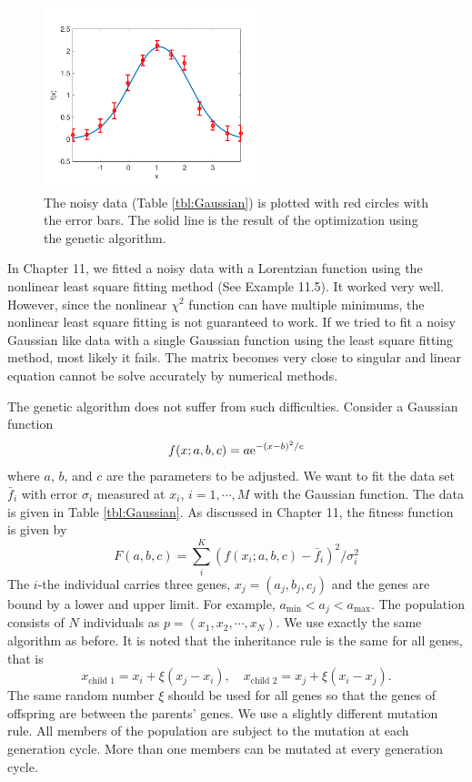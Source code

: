 \begin{figure}
\centering
\includegraphics[width=2.5in]{19.Optimization/ga_gauss.pdf}
\caption{The noisy data (Table \ref{tbl:Gaussian}) is plotted with red circles with the error bars.  The solid line is the result of the optimization using the genetic algorithm.}
\label{fig:ga_gauss}
\end{figure}

In Chapter 11, we fitted a noisy data with a Lorentzian function using the nonlinear least square fitting method (See Example 11.5). It worked very well.  However, since the nonlinear $\chi^2$ function can have multiple minimums, the nonlinear least square fitting is not guaranteed to work.   If we tried to fit a noisy Gaussian like data with a single Gaussian function using the least square fitting method, most likely it fails.  The matrix becomes very close to singular and linear equation cannot be solve accurately by numerical methods.

The genetic algorithm does not suffer from such difficulties.  Consider a Gaussian function 
\begin{equation}
f(x;a,b,c) = a \text{e}^{-(x-b)^2/c}
\end{equation}
where $a$, $b$, and $c$ are the parameters to be adjusted.  We want to fit the data set $\bar{f}_i$ with error $\sigma_i$ measured at $x_i$, $i=1, \cdots, M$ with the Gaussian function. The data is given in Table \ref{tbl:Gaussian}. As discussed in Chapter 11, the fitness function is given by
\begin{equation}
F(a,b,c) = \sum_i^K \left (f(x_i;a,b,c)-\bar{f}_i\right )^2/\sigma_i^2
\end{equation}
The $i$-the individual carries three genes, $x_j=(a_j, b_j, c_j)$ and the genes are bound by a lower and upper limit.  For example, $a_\text{min} < a_j < a_\text{max}$. The population consists of $N$ individuals as $p=(x_1, x_2, \cdots, x_N)$.  We use exactly the same algorithm as before.  It is noted that the inheritance rule is the same for all genes, that is
\begin{equation}
x_\text{child 1} = x_i + \xi (x_j-x_i), \quad x_\text{child 2} = x_j + \xi (x_i-x_j).
\end{equation} 
The same random number $\xi$ should be used for all genes so that the genes of offspring are between the parents' genes.
We use a slightly different mutation rule.  All members of the population are subject to the mutation at each generation cycle.  More than one members can be mutated at every generation cycle.



